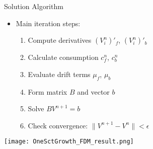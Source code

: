 \documentclass[]{beamer}
\begin{document}
\begin{frame}{Solution Algorithm}
    \begin{itemize}
        \item Main iteration steps:
        \begin{enumerate}
            \item Compute derivatives $(V_i^n)'_f$, $(V_i^n)'_b$
            \item Calculate consumption $c_f^n$, $c_b^n$
            \item Evaluate drift terms $\mu_f$, $\mu_b$
            \item Form matrix $B$ and vector $b$
            \item Solve $BV^{n+1} = b$
            \item Check convergence: $\|V^{n+1} - V^n\| < \epsilon$
        \end{enumerate}
    \end{itemize}
    \vspace{0.3cm}
    \texttt{[image: OneSctGrowth\_FDM\_result.png]}
\end{frame}
\end{document}
